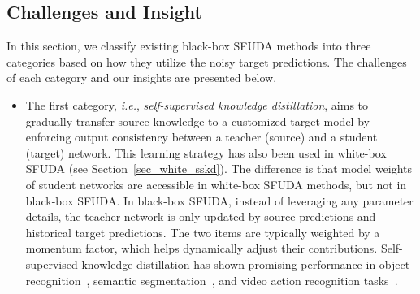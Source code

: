 \documentclass[10pt,journal,compsoc]{IEEEtran}
\def\ie{{\em i.e.}}
\begin{document}
\subsection{Challenges and Insight}
In this section, we classify existing black-box SFUDA methods into three categories based on how they utilize the noisy target predictions. 
The challenges of each category and our insights are presented below. 
\begin{itemize}[leftmargin=*]%
\item
The first category, \ie, \emph{self-supervised knowledge distillation}, aims to gradually transfer source knowledge to a customized target model by enforcing output consistency between a teacher (source) and a student (target) network.
This learning strategy has also been used in white-box SFUDA (see Section~\ref{sec_white_sskd}). 
The difference is that model weights of student networks are accessible in white-box SFUDA methods, but not in black-box SFUDA.  
In black-box SFUDA, instead of leveraging any parameter details, the teacher network is only updated by source predictions and historical target predictions.
The two items are typically weighted by a momentum factor, which helps dynamically adjust their contributions.
Self-supervised knowledge distillation has shown promising performance in object recognition~\cite{liang2022dine}, semantic segmentation~\cite{liu2022unsupervised1}, and video action recognition tasks~\cite{xu2022extern}.


\end{itemize}
\end{document}
